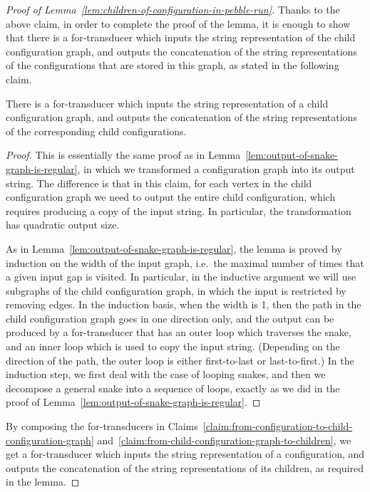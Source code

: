\begin{proof}[Proof of Lemma~\ref{lem:children-of-configuration-in-pebble-run}]
Thanks to the above claim, in order to complete the proof of the lemma, it is enough to show that there is a for-transducer which inputs the string representation of the child configuration graph, and outputs the concatenation of the string representations of the configurations that are stored in this graph, as stated in the following claim. 

    \begin{claim}\label{claim:from-child-configuration-graph-to-children}
            There is a for-transducer which inputs the string representation of a child configuration graph, and outputs the  concatenation of the string representations of the corresponding child configurations. 
    \end{claim}

    \begin{proof} This is essentially the same proof as in Lemma~\ref{lem:output-of-snake-graph-is-regular}, in which we transformed a configuration graph into its output string. The difference is that in this claim, for each vertex in the child configuration graph we need to output the entire child configuration, which requires producing a copy of the input string. In particular, the transformation has quadratic output size.

        As in Lemma~\ref{lem:output-of-snake-graph-is-regular}, the lemma is proved by induction on the width of the input graph, i.e.~the maximal number of times that a given input gap is visited. In particular, in the inductive argument we will use subgraphs of the child configuration graph, in which the input is restricted by removing  edges.  In the induction basis, when the width is 1, then the path in the child configuration graph goes in one direction only, and the output can be produced by  a for-transducer that has an outer loop which traverses the snake, and an inner loop which is used to copy the input string. (Depending on the direction of the path, the outer loop is either first-to-last or last-to-first.) In the induction step, we first deal with the case of looping snakes, and then we decompose a general snake into a sequence of loops, exactly as we did in the proof of Lemma~\ref{lem:output-of-snake-graph-is-regular}.
    \end{proof}

By composing the for-transducers in Claims~\ref{claim:from-configuration-to-child-configuration-graph} and~\ref{claim:from-child-configuration-graph-to-children}, we get a for-transducer which inputs the string representation of a configuration, and outputs the concatenation of the string representations of its children, as required in the lemma.
\end{proof}





